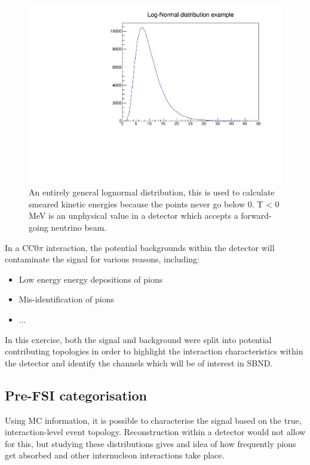    \begin{figure}[h!]
        \centering
        \includegraphics[width=.8\textwidth, trim=0 0 0 1cm, clip]{images/log_norm.pdf}
        \caption{An entirely general lognormal distribution, this is used to calculate smeared kinetic energies because the points never go below 0. T < 0 MeV is an unphysical value in a detector which accepts a forward-going neutrino beam.}
        \label{fig:logNorm}
    \end{figure}

In a CC0\(\pi\) interaction, the potential backgrounds within the detector will contaminate the signal for various reasons, including:

\begin{itemize}
    \item Low energy energy depositions of pions
    \item Mis-identification of pions
    \item ...
\end{itemize}

In this exercise, both the signal and background were split into potential contributing topologies in order to highlight the interaction characteristics within the detector and identify the channels which will be of interest in SBND. 

\subsection{Pre-FSI categorisation}

Using MC information, it is possible to characterise the signal based on the true, interaction-level event topology. Reconstruction within a detector would not allow for this, but studying these distributions gives and idea of how frequently pions get absorbed and other internucleon interactions take place.  




